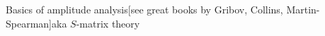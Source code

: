 \documentclass[aspectratio=169]{beamer}
\newcommand{\paper}[1]{{\scriptsize[#1]}}
\begin{document}
\begin{frame}{Basics of amplitude analysis\hfill\paper{see great books by Gribov, Collins, Martin-Spearman}}{aka $S$-matrix theory}
\begin{columns}
\begin{column}{0.5\textwidth}
\begin{overlayarea}{\textwidth}{0.55\textheight}

\end{overlayarea}
\end{column}
\end{columns}
\end{frame}
\end{document}
